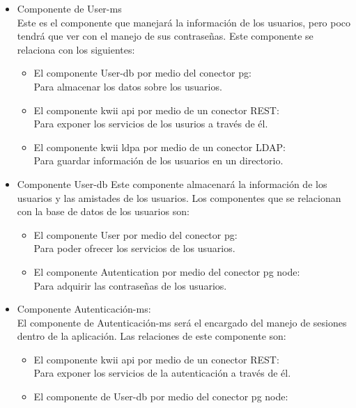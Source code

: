 \begin{itemize}
\begin{itemize}
    \end{itemize}
    \item Componente de User-ms\\
    Este es el componente que manejará la información de los usuarios, pero poco tendrá que ver con el manejo de sus contraseñas.
    Este componente se relaciona con los siguientes:
    \begin{itemize}
        \item El componente User-db por medio del conector pg:\\
        Para almacenar los datos sobre los usuarios.
        \item El componente kwii \textunderscore api por medio de un conector REST:\\
        Para exponer los servicios de los usurios a través de él.
        \item El componente kwii \textunderscore ldpa por medio de un conector LDAP:\\
        Para guardar información de los usuarios en un directorio.
    \end{itemize}
    \item Componente User-db
    Este componente almacenará la información de los usuarios y las amistades de los usuarios.
    Los componentes que se relacionan con la base de datos de los usuarios son:
    \begin{itemize}
        \item El componente User por medio del conector pg:\\
        Para poder ofrecer los servicios de los usuarios.
        \item El componente Autentication por medio del conector pg node:\\
        Para adquirir las contraseñas de los usuarios.
    \end{itemize}
    \item Componente Autenticación-ms:\\
    El componente de Autenticación-ms será el encargado del manejo de sesiones dentro de la aplicación.
    Las relaciones de este componente son:
    \begin{itemize}
        \item El componente kwii \textunderscore api por medio de un conector REST:\\
        Para exponer los servicios de la autenticación a través de él.
        \item El componente de User-db por medio del conector pg node:\\

\end{itemize}
\end{itemize}
